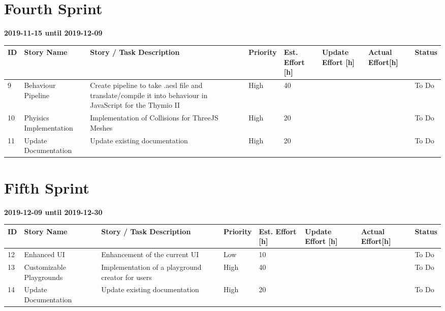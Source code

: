 \documentclass{scrbook}
\begin{document}
\section{Fourth Sprint}
\textbf{2019-11-15 until 2019-12-09}
\begin{longtable}{p{5mm}|p{2cm}|p{4cm}|p{1cm}|p{1cm}|p{1cm}|p{1cm}|p{15mm}}
  ID                     & Story Name & Story / Task Description & Priority & Est. Effort {[}h{]} & Update Effort {[}h{]} & Actual Effort{[}h{]} & Status                \\ \hline
  9 & Behaviour Pipeline & Create pipeline to take .aesl file and translate/compile it into behaviour in JavaScript for the Thymio II & High & 40 &  &  & To Do \\ 
  10 & Phyisics Implementation & Implementation of Collisions for ThreeJS Meshes & High & 20 &  &  & To Do \\
  11 & Update Documentation & Update existing documentation & High & 20 &  &  & To Do \\ 
\end{longtable}

\section{Fifth Sprint}
\textbf{2019-12-09 until 2019-12-30}
\begin{longtable}{p{5mm}|p{2cm}|p{4cm}|p{1cm}|p{1cm}|p{1cm}|p{1cm}|p{15mm}}
  ID                     & Story Name & Story / Task Description & Priority & Est. Effort {[}h{]} & Update Effort {[}h{]} & Actual Effort{[}h{]} & Status                \\ \hline
  12 & Enhanced UI & Enhancement of the current UI & Low & 10 &  &  & To Do \\ 
  13 & Customizable Playgrounds & Implementation of a playground creator for users & High & 40 &  &  & To Do \\ 
  14 & Update Documentation & Update existing documentation & High & 20 &  &  & To Do \\ 
\end{longtable}
\end{document}
